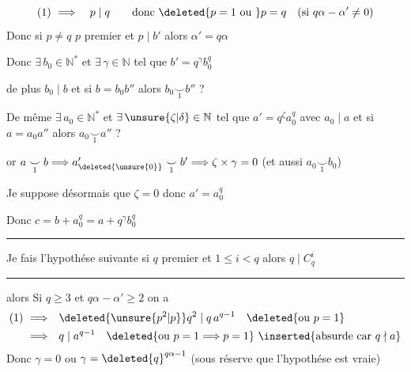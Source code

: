 \[
(1)\ \Longrightarrow\quad p\mid q\qquad\text{donc }\deleted{p=1\ \text{ou }}p=q\quad(\text{si }q\alpha-\alpha'\ne0)
\]
Donc si $p\ne q$ \quad $p$ premier  et $p\mid b'$ alors $\alpha'=q\alpha$ 

Donc $\exists\,b_0\in\mathbb N^*$ et $\exists\,\gamma\in\mathbb N$ tel que $b'=q^\gamma b_0^q$ 

de plus $b_0\mid b$ et si $b=b_0 b''$ alors $b_0\mathrel{\underset{1}{\smile}}b''$ ?

De même $\exists\,a_0\in\mathbb N^*$ et $\exists\,\unsure{\zeta|\delta}\in\mathbb N$ tel que $a'=q^\zeta a_0^q$ avec $a_0\mid a$ et si $a=a_0a''$ alors $a_0\mathrel{\underset{1}{\smile}}a''$ ?

or $a\mathrel{\underset{1}{\smile}}b\Longrightarrow a_{\deleted{\unsure{0}}}'\mathrel{\underset{1}{\smile}}b'\Longrightarrow\zeta\times\gamma=0$ (et aussi $a_0\mathrel{\underset{1}{\smile}}b_0$)

Je suppose désormais que $\zeta=0$ donc $a'=a_0^q$

Donc \quad $c=b+a_0^q=a+q^\gamma b_0^q$

\noindent\rule{\linewidth}{.35pt}\par
Je fais l'hypothése suivante \quad si $q$ premier et $1\leqslant i<q$ alors $q\mid C_q^i$
\par\noindent\rule{\linewidth}{.35pt}\par
alors Si $q\geqslant3$ et $q\alpha-\alpha'\geqslant2$  on a 
\[
\begin{aligned}
(1)\ \Longrightarrow\quad &\deleted{\unsure{p^{2}|p}}q^2\mid q\,a^{q-1}\quad\deleted{\text{ou }p=1}\\
\Longrightarrow\quad&q\mid a^{q-1}\quad\deleted{\text{ou }p=1\Longrightarrow p=1}\ \inserted{\text{absurde car }q\nmid a}
\end{aligned}
\]
Donc $\gamma=0$ ou $\gamma={\deleted{q}}^{q\alpha-1}$ (sous réserve que l'hypothése est vraie)%

